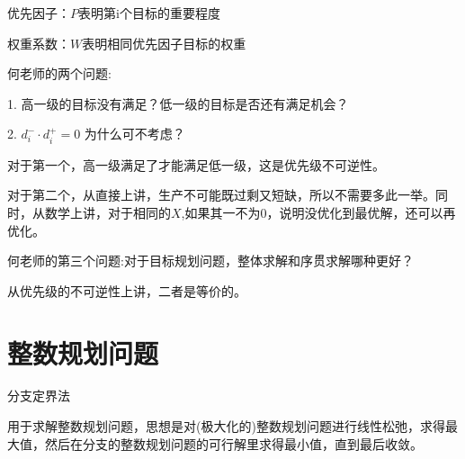 \documentclass[12pt, a4paper, oneside, UTF8]{ctexbook}
\begin{document}
\begin{remark}
    优先因子：$P$表明第i个目标的重要程度

    权重系数：$W$表明相同优先因子目标的权重
\end{remark}

何老师的两个问题:

1. 高一级的目标没有满足？低一级的目标是否还有满足机会？

2. \( d_i^- \cdot d_i^+ = 0 \) 为什么可不考虑？

对于第一个，高一级满足了才能满足低一级，这是优先级不可逆性。

对于第二个，从直接上讲，生产不可能既过剩又短缺，所以不需要多此一举。同时，从数学上讲，对于相同的$X$,如果其一不为0，说明没优化到最优解，还可以再优化。

何老师的第三个问题:对于目标规划问题，整体求解和序贯求解哪种更好？

从优先级的不可逆性上讲，二者是等价的。

\section{整数规划问题}

\begin{definition}
    分支定界法

    用于求解整数规划问题，思想是对(极大化的)整数规划问题进行线性松弛，求得最大值，然后在分支的整数规划问题的可行解里求得最小值，直到最后收敛。
\end{definition}
\end{document}
